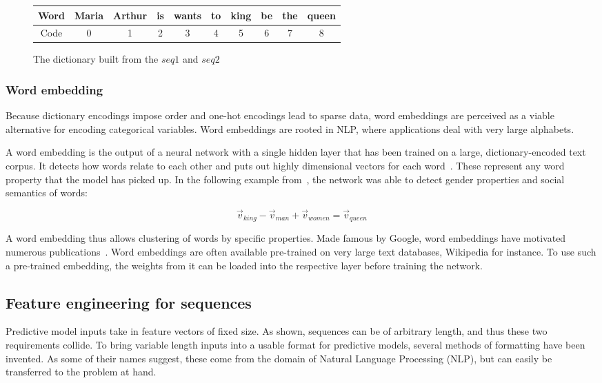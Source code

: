 \begin{figure}
    \centering
    \begin{tabular}{c|ccccccccc}
        Word & Maria & Arthur & is & wants & to & king & be & the & queen\\
        \midrule
        Code & 0 & 1 & 2 & 3 & 4 & 5 & 6 & 7 & 8
    \end{tabular}
    \caption{The dictionary built from the $seq1$ and $seq2$}
    \label{tab:dictionary-encoding}
\end{figure}

\subsubsection*{Word embedding}\label{sec:background:word-embedding}
Because dictionary encodings impose order and one-hot encodings lead to sparse data, word embeddings are perceived as a viable alternative for encoding categorical variables. Word embeddings are rooted in NLP, where applications deal with very large alphabets.

A word embedding is the output of a neural network with a single hidden layer that has been trained on a large, dictionary-encoded text corpus. It detects how words relate to each other and puts out highly dimensional vectors for each word~\cite{web:word-embedding}. These represent any word property that the model has picked up. In the following example from~\cite{mikolov2013distributed}, the network was able to detect gender properties and social semantics of words:

$$
\vec{v}_{king} - \vec{v}_{man} + \vec{v}_{women} = \vec{v}_{queen}
$$

A word embedding thus allows clustering of words by specific properties. Made famous by Google, word embeddings have motivated numerous publications~\cite{web:ahogrammer, goldberg2014word2vec}. Word embeddings are often available pre-trained on very large text databases, Wikipedia for instance. To use such a pre-trained embedding, the weights from it can be loaded into the respective layer before training the network.

\subsection{Feature engineering for sequences}\label{sec:sequential-feature-engineering}
Predictive model inputs take in feature vectors of fixed size. As shown, sequences can be of arbitrary length, and thus these two requirements collide. To bring variable length inputs into a usable format for predictive models, several methods of formatting have been invented. As some of their names suggest, these come from the domain of Natural Language Processing (NLP), but can easily be transferred to the problem at hand.

